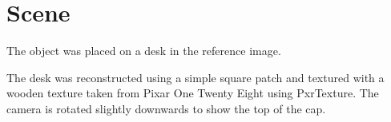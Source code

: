 \section{Scene}
The object was placed on a desk in the reference image.

The desk was reconstructed using a simple square patch and textured with a wooden texture taken from Pixar One Twenty Eight \cite{pixar2018} using PxrTexture.
The camera is rotated slightly downwards to show the top of the cap.